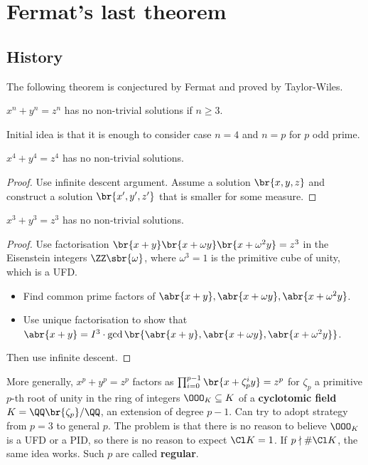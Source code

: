 \pagebreak

\appendix

\section{Fermat's last theorem}

\subsection{History}

The following theorem is conjectured by Fermat and proved by Taylor-Wiles.

\begin{theorem}
$ x^n + y^n = z^n $ has no non-trivial solutions if $ n \ge 3 $.
\end{theorem}

Initial idea is that it is enough to consider case $ n = 4 $ and $ n = p $ for $ p $ odd prime.

\begin{theorem}[Fermat]
$ x^4 + y^4 = z^4 $ has no non-trivial solutions.
\end{theorem}

\begin{proof}
Use infinite descent argument. Assume a solution $ \br{x, y, z} $ and construct a solution $ \br{x', y', z'} $ that is smaller for some measure.
\end{proof}

\begin{theorem}[Euler]
$ x^3 + y^3 = z^3 $ has no non-trivial solutions.
\end{theorem}

\begin{proof}
Use factorisation $ \br{x + y}\br{x + \omega y}\br{x + \omega^2y} = z^3 $ in the Eisenstein integers $ \ZZ\sbr{\omega} $, where $ \omega^3 = 1 $ is the primitive cube of unity, which is a UFD.
\begin{itemize}
\item Find common prime factors of $ \abr{x + y}, \abr{x + \omega y}, \abr{x + \omega^2y} $.
\item Use unique factorisation to show that $ \abr{x + y} = I^3 \cdot \gcd\br{\abr{x + y}, \abr{x + \omega y}, \abr{x + \omega^2y}} $.
\end{itemize}
Then use infinite descent.
\end{proof}

More generally, $ x^p + y^p = z^p $ factors as $ \prod_{i = 0}^{p - 1} \br{x + \zeta_p^iy} = z^p $ for $ \zeta_p $ a primitive $ p $-th root of unity in the ring of integers $ \OOO_K \subseteq K $ of a \textbf{cyclotomic field} $ K = \QQ\br{\zeta_p} / \QQ $, an extension of degree $ p - 1 $. Can try to adopt strategy from $ p = 3 $ to general $ p $. The problem is that there is no reason to believe $ \OOO_K $ is a UFD or a PID, so there is no reason to expect $ \Cl K = 1 $. If $ p \nmid \#\Cl K $, the same idea works. Such $ p $ are called \textbf{regular}.

